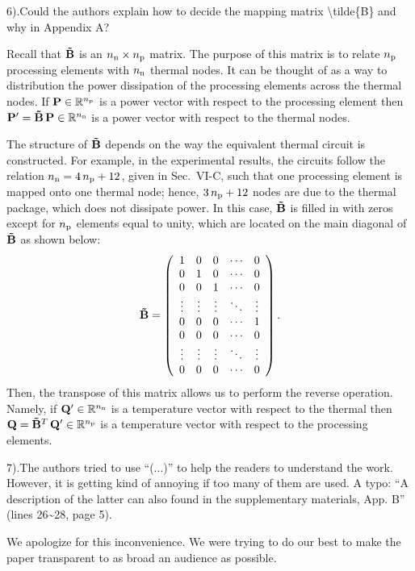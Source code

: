 \begin{reviewer}
6).Could the authors explain how to decide the mapping matrix \textbackslash{}tilde\{B\} and why in Appendix A?
\end{reviewer}
\begin{authors}
Recall that $\mM$ is an ${n_\text{n}} \times {n_\text{p}}$ matrix.
The purpose of this matrix is to relate ${n_\text{p}}$ processing elements with ${n_\text{n}}$ thermal nodes.
It can be thought of as a way to distribution the power dissipation of the processing elements across the thermal nodes.
If $\mathbf{P} \in \mathbb{R}^{n_\text{p}}$ is a power vector with respect to the processing element then $\v{P}' = \mM \, \v{P} \in \real^\nnodes$ is a power vector with respect to the thermal nodes.

The structure of $\mM$ depends on the way the equivalent thermal circuit is constructed.
For example, in the experimental results, the circuits follow the relation ${n_\text{n}} = 4 \, {n_\text{p}} + 12$, given in Sec.~VI-C, such that one processing element is mapped onto one thermal node; hence, $3 \, {n_\text{p}} + 12$ nodes are due to the thermal package, which does not dissipate power.
In this case, $\mM$ is filled in with zeros except for ${n_\text{p}}$ elements equal to unity, which are located on the main diagonal of $\mM$ as shown below:
\[
  \mM = \left(
    \begin{array}{ccccc}
      1 & 0 & 0 & \cdots & 0 \\
      0 & 1 & 0 & \cdots & 0 \\
      0 & 0 & 1 & \cdots & 0 \\
      \vdots & \vdots & \vdots & \ddots & \vdots \\
      0 & 0 & 0 & \cdots & 1 \\
      0 & 0 & 0 & \cdots & 0 \\
      \vdots & \vdots & \vdots & \ddots & \vdots \\
      0 & 0 & 0 & \cdots & 0
    \end{array}
  \right).
\]
Then, the transpose of this matrix allows us to perform the reverse operation.
Namely, if $\mathbf{Q}' \in \mathbb{R}^{n_\text{n}}$ is a temperature vector with respect to the thermal then $\v{Q} = \mM^T \, \v{Q}' \in \real^\nprocs$ is a temperature vector with respect to the processing elements.

\end{authors}

\begin{reviewer}
7).The authors tried to use  ``(...)'' to help the readers to understand the work. However, it is getting kind of annoying if too many of them are used. A typo: ``A description of the latter can also found in the supplementary materials, App. B'' (lines 26\~{}28, page 5).
\end{reviewer}
\begin{authors}
We apologize for this inconvenience.
We were trying to do our best to make the paper transparent to as broad an audience as possible.


\end{authors}
